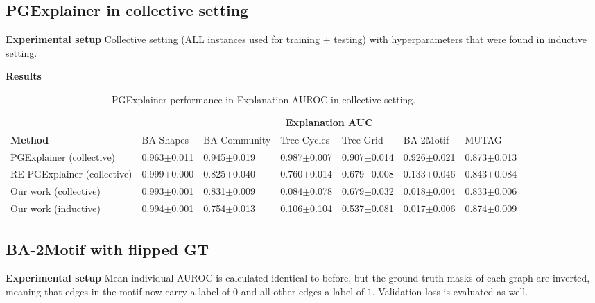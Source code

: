 \subsection{PGExplainer in collective setting}

\textbf{Experimental setup}
Collective setting (ALL instances used for training + testing) with hyperparameters that were found in inductive setting.

\textbf{Results}

\begin{table}[ht]
    \centering
    \scriptsize
    \begin{tabularx}{\textwidth}{l*{6}{X}}   %
    \toprule
    \textbf{} & \multicolumn{6}{c}{\textbf{Explanation AUC}} \\
    \cmidrule{2-7}
    \textbf{Method} & BA-Shapes & BA-Community & Tree-Cycles & Tree-Grid & BA-2Motif & MUTAG \\
    \midrule
    PGExplainer (collective) & 0.963$\pm$0.011 & 0.945$\pm$0.019 & 0.987$\pm$0.007 & 0.907$\pm$0.014 & 0.926$\pm$0.021 & 0.873$\pm$0.013 \\
    \midrule
    RE-PGExplainer (collective) & 0.999$\pm$0.000 & 0.825$\pm$0.040 & 0.760$\pm$0.014 & 0.679$\pm$0.008 & 0.133$\pm$0.046 & 0.843$\pm$0.084 \\
    \midrule
    Our work (collective) & 0.993$\pm$0.001 & 0.831$\pm$0.009 & 0.084$\pm$0.078 & 0.679$\pm$0.032 & 0.018$\pm$0.004 & 0.833$\pm$0.006 \\
    \midrule
    \midrule
    Our work (inductive) & 0.994$\pm$0.001 & 0.754$\pm$0.013 & 0.106$\pm$0.104 & 0.537$\pm$0.081 & 0.017$\pm$0.006 & 0.874$\pm$0.009 \\
    \bottomrule
    \end{tabularx}
    \caption[Collective performance of our reimplementation]{PGExplainer performance in Explanation AUROC in collective setting.}
    \label{tab:pgexplainer_auc}
\end{table}

\subsection{BA-2Motif with flipped GT}

\textbf{Experimental setup}
Mean individual AUROC is calculated identical to before, but the ground truth masks of each graph are inverted, meaning that edges in the motif now carry a label of $0$ and all other edges a label of $1$. Validation loss is evaluated as well.


